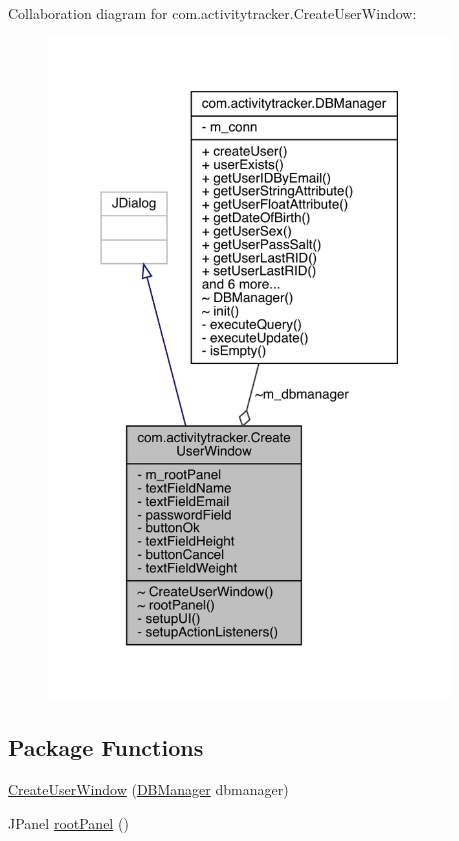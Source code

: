 Collaboration diagram for com.\+activitytracker.\+Create\+User\+Window\+:
\nopagebreak
\begin{figure}[H]
\begin{center}
\leavevmode
\includegraphics[width=302pt]{classcom_1_1activitytracker_1_1_create_user_window__coll__graph}
\end{center}
\end{figure}
\subsection*{Package Functions}
\begin{DoxyCompactItemize}
\item 
\mbox{\hyperlink{classcom_1_1activitytracker_1_1_create_user_window_a98ea46c069948eaf857173a0d93f64bb}{Create\+User\+Window}} (\mbox{\hyperlink{classcom_1_1activitytracker_1_1_d_b_manager}{D\+B\+Manager}} dbmanager)
\item 
J\+Panel \mbox{\hyperlink{classcom_1_1activitytracker_1_1_create_user_window_a862f018ae96eb5df7529ff1beb312ff1}{root\+Panel}} ()
\end{DoxyCompactItemize}

